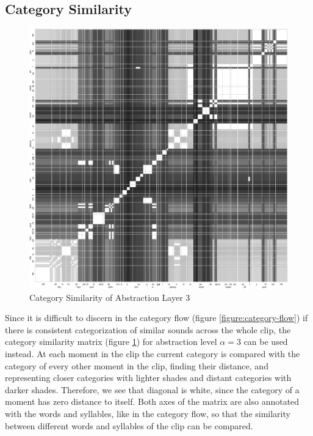 \subsection{Category Similarity}
\label{section:category-similarity}

\begin{figure}
  \centering
  \includegraphics[width=\linewidth]{fig/category-similarity-90.pdf}
  \caption{Category Similarity of Abstraction Layer 3}
  \label{figure:category-similarity}
\end{figure}

Since it is difficult to discern in the category flow (figure \ref{figure:category-flow}) if there is consistent categorization of similar sounds across the whole clip, the category similarity matrix (figure \ref{figure:category-similarity}) for abstraction level $\alpha = 3$ can be used instead.  At each moment in the clip the current category is compared with the category of every other moment in the clip, finding their distance, and representing closer categories with lighter shades and distant categories with darker shades.  Therefore, we see that diagonal is white, since the category of a moment has zero distance to itself.  Both axes of the matrix are also annotated with the words and syllables, like in the category flow, so that the similarity between different words and syllables of the clip can be compared.

